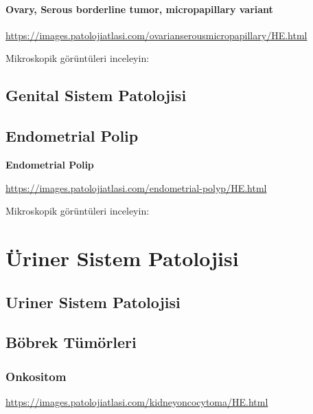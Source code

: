 \documentclass[
  letterpaper,
  DIV=11,
  numbers=noendperiod]{scrreprt}
\begin{document}
\hypertarget{ovary-serous-borderline-tumor-micropapillary-variant}{%
\subsection{Ovary, Serous borderline tumor, micropapillary
variant}\label{ovary-serous-borderline-tumor-micropapillary-variant}}

\url{https://images.patolojiatlasi.com/ovarianserousmicropapillary/HE.html}

Mikroskopik görüntüleri inceleyin:

\hypertarget{genital-sistem-patolojisi}{%
\chapter{Genital Sistem Patolojisi}\label{genital-sistem-patolojisi}}

\hypertarget{endometrial-polip}{%
\chapter{Endometrial Polip}\label{endometrial-polip}}

\textbf{Endometrial Polip}

\url{https://images.patolojiatlasi.com/endometrial-polyp/HE.html}

Mikroskopik görüntüleri inceleyin:

\part{Üriner Sistem Patolojisi}

\hypertarget{uriner-sistem-patolojisi}{%
\chapter{Uriner Sistem Patolojisi}\label{uriner-sistem-patolojisi}}

\hypertarget{buxf6brek-tuxfcmuxf6rleri}{%
\chapter{Böbrek Tümörleri}\label{buxf6brek-tuxfcmuxf6rleri}}

\hypertarget{onkositom}{%
\section{Onkositom}\label{onkositom}}

\url{https://images.patolojiatlasi.com/kidneyoncocytoma/HE.html}
\end{document}

